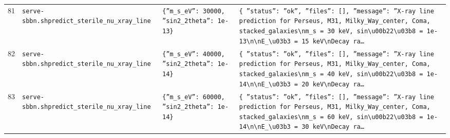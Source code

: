 \documentclass[11pt,a4paper]{article}
\begin{document}
\begin{longtable}{@{}p{}p{}p{}p{}@{}}
81 & \texttt{serve-sbbn.sh}\newline\texttt{predict\_\allowbreak{}sterile\_\allowbreak{}nu\_\allowbreak{}xray\_\allowbreak{}line} & \texttt{\{''m\_\allowbreak{}s\_\allowbreak{}eV'':\allowbreak{} 30000,\allowbreak{} ''sin2\_\allowbreak{}2theta'':\allowbreak{} 1e-13\}\allowbreak{}} & \texttt{\{   ''status'':\allowbreak{} ''ok'',\allowbreak{}   ''files'':\allowbreak{} []\allowbreak{},\allowbreak{}   ''message'':\allowbreak{} ''X-ray line prediction for Perseus,\allowbreak{} M31,\allowbreak{} Milky\_\allowbreak{}Way\_\allowbreak{}center,\allowbreak{} Coma,\allowbreak{} stacked\_\allowbreak{}galaxies\textbackslash{}\allowbreak{}nm\_\allowbreak{}s =\allowbreak{} 30 keV,\allowbreak{} sin\textbackslash{}\allowbreak{}u00b22\textbackslash{}\allowbreak{}u03b8 =\allowbreak{} 1e-13\textbackslash{}\allowbreak{}n\textbackslash{}\allowbreak{}nE\_\allowbreak{}\textbackslash{}\allowbreak{}u03b3 =\allowbreak{} 15 keV\textbackslash{}\allowbreak{}nDecay ra\ldots{}\allowbreak{}} \\
82 & \texttt{serve-sbbn.sh}\newline\texttt{predict\_\allowbreak{}sterile\_\allowbreak{}nu\_\allowbreak{}xray\_\allowbreak{}line} & \texttt{\{''m\_\allowbreak{}s\_\allowbreak{}eV'':\allowbreak{} 40000,\allowbreak{} ''sin2\_\allowbreak{}2theta'':\allowbreak{} 1e-14\}\allowbreak{}} & \texttt{\{   ''status'':\allowbreak{} ''ok'',\allowbreak{}   ''files'':\allowbreak{} []\allowbreak{},\allowbreak{}   ''message'':\allowbreak{} ''X-ray line prediction for Perseus,\allowbreak{} M31,\allowbreak{} Milky\_\allowbreak{}Way\_\allowbreak{}center,\allowbreak{} Coma,\allowbreak{} stacked\_\allowbreak{}galaxies\textbackslash{}\allowbreak{}nm\_\allowbreak{}s =\allowbreak{} 40 keV,\allowbreak{} sin\textbackslash{}\allowbreak{}u00b22\textbackslash{}\allowbreak{}u03b8 =\allowbreak{} 1e-14\textbackslash{}\allowbreak{}n\textbackslash{}\allowbreak{}nE\_\allowbreak{}\textbackslash{}\allowbreak{}u03b3 =\allowbreak{} 20 keV\textbackslash{}\allowbreak{}nDecay ra\ldots{}\allowbreak{}} \\
83 & \texttt{serve-sbbn.sh}\newline\texttt{predict\_\allowbreak{}sterile\_\allowbreak{}nu\_\allowbreak{}xray\_\allowbreak{}line} & \texttt{\{''m\_\allowbreak{}s\_\allowbreak{}eV'':\allowbreak{} 60000,\allowbreak{} ''sin2\_\allowbreak{}2theta'':\allowbreak{} 1e-14\}\allowbreak{}} & \texttt{\{   ''status'':\allowbreak{} ''ok'',\allowbreak{}   ''files'':\allowbreak{} []\allowbreak{},\allowbreak{}   ''message'':\allowbreak{} ''X-ray line prediction for Perseus,\allowbreak{} M31,\allowbreak{} Milky\_\allowbreak{}Way\_\allowbreak{}center,\allowbreak{} Coma,\allowbreak{} stacked\_\allowbreak{}galaxies\textbackslash{}\allowbreak{}nm\_\allowbreak{}s =\allowbreak{} 60 keV,\allowbreak{} sin\textbackslash{}\allowbreak{}u00b22\textbackslash{}\allowbreak{}u03b8 =\allowbreak{} 1e-14\textbackslash{}\allowbreak{}n\textbackslash{}\allowbreak{}nE\_\allowbreak{}\textbackslash{}\allowbreak{}u03b3 =\allowbreak{} 30 keV\textbackslash{}\allowbreak{}nDecay ra\ldots{}\allowbreak{}} \\

\end{longtable}
\end{document}

